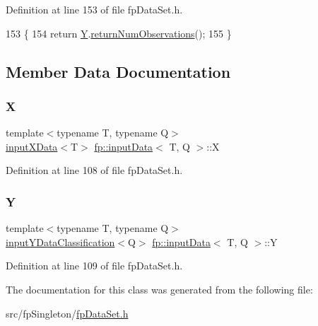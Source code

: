 Definition at line 153 of file fp\+Data\+Set.\+h.


\begin{DoxyCode}
153                                           \{
154             \textcolor{keywordflow}{return} \hyperlink{classfp_1_1inputData_a2ec8c0c7b9a8e114673c703edea4283d}{Y}.\hyperlink{classfp_1_1inputYData_a6f6c2742745fd59daafef4e51d76400a}{returnNumObservations}();
155         \}
\end{DoxyCode}


\subsection{Member Data Documentation}
\mbox{\label{classfp_1_1inputData_ad19581a60d2af60ebd3c8be5ac5ad95e}} 
\subsubsection{\texorpdfstring{X}{X}}
{\footnotesize\ttfamily template$<$typename T, typename Q$>$ \\
\hyperlink{classfp_1_1inputXData}{input\+X\+Data}$<$T$>$ \hyperlink{classfp_1_1inputData}{fp\+::input\+Data}$<$ T, Q $>$\+::X\hspace{0.3cm}{\ttfamily [private]}}



Definition at line 108 of file fp\+Data\+Set.\+h.

\mbox{\label{classfp_1_1inputData_a2ec8c0c7b9a8e114673c703edea4283d}} 
\subsubsection{\texorpdfstring{Y}{Y}}
{\footnotesize\ttfamily template$<$typename T, typename Q$>$ \\
\hyperlink{classfp_1_1inputYDataClassification}{input\+Y\+Data\+Classification}$<$Q$>$ \hyperlink{classfp_1_1inputData}{fp\+::input\+Data}$<$ T, Q $>$\+::Y\hspace{0.3cm}{\ttfamily [private]}}



Definition at line 109 of file fp\+Data\+Set.\+h.



The documentation for this class was generated from the following file\+:\begin{DoxyCompactItemize}
\item 
src/fp\+Singleton/\hyperlink{fpDataSet_8h}{fp\+Data\+Set.\+h}\end{DoxyCompactItemize}
